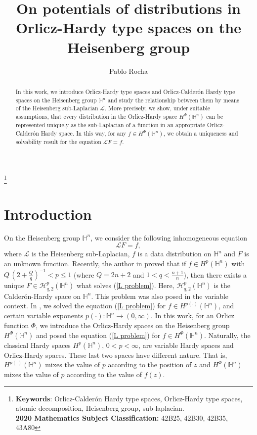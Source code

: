 \documentclass[oneside,10pt]{article}
\newcommand\blfootnote[1]{%
  \begingroup
  \renewcommand\thefootnote{}\footnote{#1}%
  \addtocounter{footnote}{-1}%
  \endgroup}
\begin{document}
\title{On potentials of distributions in Orlicz-Hardy type spaces on the Heisenberg group}
\author{Pablo Rocha}

\maketitle


\begin{abstract}
In this work, we introduce Orlicz-Hardy type spaces and Orlicz-Calder\'on Hardy type spaces on the Heisenberg group $\mathbb{H}^{n}$ and study the relationship between them by means of the Heisenberg sub-Laplacian $\mathcal{L}$. More precisely, we show, under suitable assumptions, that every distribution in the Orlicz-Hardy space $H^{\Phi}(\mathbb{H}^{n})$ can be represented uniquely as the sub-Laplacian of a function in an appropriate Orlicz-Calder\'on Hardy space. In this way, for any $f \in H^{\Phi}(\mathbb{H}^{n})$,  we obtain a uniqueness and solvability result for the equation $\mathcal{L}F=f$.
\end{abstract}

\blfootnote{{\bf Keywords}: Orlicz-Calder\'on Hardy type spaces, Orlicz-Hardy type spaces, atomic decomposition, Heisenberg group, sub-laplacian. \\
{\bf 2020 Mathematics Subject Classification:} 42B25, 42B30, 42B35, 43A80}

\section{Introduction}

On the Heisenberg group $\mathbb{H}^n$, we consider the following inhomogeneous equation
\begin{equation} \label{L problem}
\mathcal{L} F = f,
\end{equation}
where $\mathcal{L}$ is the Heisenberg sub-Laplacian, $f$ is a data distribution on $\mathbb{H}^n$ and $F$ is an unknown function. Recently, the author in \cite{rocha3} proved that if $f \in H^p(\mathbb{H}^n)$ with $Q \, (2 + \frac{Q}{q})^{-1} < p \leq 1$ (where $Q = 2n+2$ and 
$1 < q < \frac{n+1}{n}$), then there exists a unique $F \in \mathcal{H}^{p}_{q, 2}(\mathbb{H}^n)$ what solves (\ref{L problem}). Here, 
$\mathcal{H}^{p}_{q, 2}(\mathbb{H}^n)$ is the Calder\'on-Hardy space on $\mathbb{H}^n$. This problem was also posed in the variable context. In \cite{rocha4}, we solved the equation (\ref{L problem}) for $f \in H^{p(\cdot)}(\mathbb{H}^n)$, and certain variable exponents 
$p(\cdot) : \mathbb{H}^n \to (0, \infty)$. In this work, for an Orlicz function $\Phi$, we introduce the Orlicz-Hardy spaces on the Heisenberg group $H^{\Phi}(\mathbb{H}^n)$ and posed the equation (\ref{L problem}) for $f \in H^{\Phi}(\mathbb{H}^n)$. Naturally, the classical Hardy spaces $H^{p}(\mathbb{H}^n)$, $0 < p < \infty$, are variable Hardy spaces and Orlicz-Hardy spaces. These last two spaces have different nature. That is, $H^{p(\cdot)}(\mathbb{H}^n)$ mixes the value of $p$ according to the position of $z$ and $H^{\Phi}(\mathbb{H}^n)$ mixes the value of $p$ according to the value of $f(z)$. 
\end{document}
